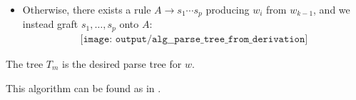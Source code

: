 \begin{algorithm}
\begin{thmenum}
\begin{itemize}
      \item Otherwise, there exists a rule \( A \to s_1 \cdots s_p \) producing \( w_i \) from \( w_{k-1} \), and we instead graft \( s_1, \ldots, s_p \) onto \( A \):
      \begin{equation*}
        \begin{aligned}
          \texttt{[image: output/alg\_\_parse\_tree\_from\_derivation]}
        \end{aligned}
      \end{equation*}
    \end{itemize}
  \end{thmenum}

   The tree \( T_m \) is the desired parse tree for \( w \).
\end{algorithm}
\begin{comments}
  \item This algorithm can be found as  in \cite{code}.
\end{comments}

